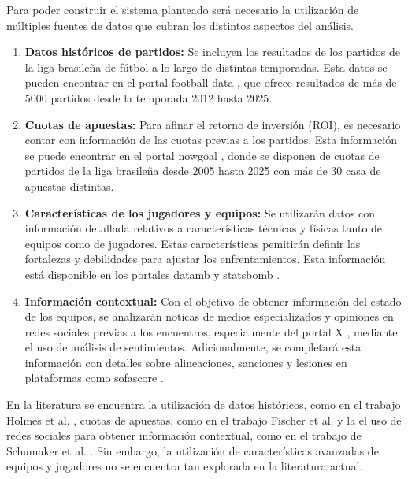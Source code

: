 Para poder construir el sistema planteado será necesario la utilización de múltiples fuentes de datos que cubran los distintos aspectos del análisis.

\begin{enumerate}
    \item \textbf{Datos históricos de partidos:} Se incluyen los resultados de los partidos de la liga brasileña de fútbol a lo largo de distintas temporadas. Esta datos se pueden encontrar en el portal football data \cite{footballData}, que ofrece resultados de más de 5000 partidos desde la temporada 2012 hasta 2025.

    \item \textbf{Cuotas de apuestas:} Para afinar el retorno de inversión (ROI), es necesario contar con información de las cuotas previas a los partidos. Esta información se puede encontrar en el portal nowgoal \cite{nowgoalOdds}, donde se disponen de cuotas de partidos de la liga brasileña desde 2005 hasta 2025 con más de 30 casa de apuestas distintas.
    
    \item \textbf{Características de los jugadores y equipos:} Se utilizarán datos con información detallada relativos a características técnicas y físicas tanto de equipos como de jugadores. Estas características pemitirán definir las fortalezas y debilidades para ajustar los enfrentamientos. Esta información está disponible en los portales datamb \cite{datamb} y statsbomb \cite{statsbomb}.
    \item \textbf{Información contextual:} Con el objetivo de obtener información del estado de los equipos, se analizarán noticas de medios especializados y opiniones en redes sociales previas a los encuentros, especialmente del portal X \cite{twitter}, mediante el uso de análisis de sentimientos. Adicionalmente, se completará esta información con detalles sobre alineaciones, sanciones y lesiones en plataformas como sofascore \cite{sofascore}.
\end{enumerate}

En la literatura se encuentra la utilización de datos históricos, como en el trabajo Holmes et al. \cite{holmesForecastingFootballMatch2024}, cuotas de apuestas, como en el trabajo Fischer et al. \cite{Fisher2024PricingResponse} y la el uso de redes sociales para obtener información contextual, como en el trabajo de Schumaker et al. \cite{Schumaker2016}. Sin embargo, la utilización de características avanzadas de equipos y jugadores no se encuentra tan explorada en la literatura actual.

